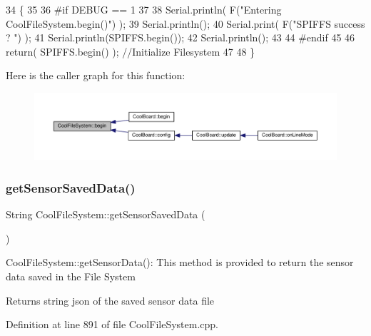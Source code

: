 \begin{DoxyCode}
34 \{
35 
36 \textcolor{preprocessor}{#if DEBUG == 1}
37 
38     Serial.println( F(\textcolor{stringliteral}{"Entering CoolFileSystem.begin()"}) );
39     Serial.println();   
40     Serial.print( F(\textcolor{stringliteral}{"SPIFFS success ? "}) );
41     Serial.println(SPIFFS.begin());
42     Serial.println();
43 
44 \textcolor{preprocessor}{#endif}
45 
46     \textcolor{keywordflow}{return}( SPIFFS.begin() );                                   \textcolor{comment}{//Initialize Filesystem}
47 
48 \}
\end{DoxyCode}
Here is the caller graph for this function\+:\nopagebreak
\begin{figure}[H]
\begin{center}
\leavevmode
\includegraphics[width=350pt]{classCoolFileSystem_a6ba6f666ed4c530174f8569d2c636748_icgraph}
\end{center}
\end{figure}
\mbox{\label{classCoolFileSystem_a5c58bca3735c0ed3efb268d70ef998ef}} 
\subsubsection{\texorpdfstring{get\+Sensor\+Saved\+Data()}{getSensorSavedData()}}
{\footnotesize\ttfamily String Cool\+File\+System\+::get\+Sensor\+Saved\+Data (\begin{DoxyParamCaption}{ }\end{DoxyParamCaption})}

Cool\+File\+System\+::get\+Sensor\+Data()\+: This method is provided to return the sensor data saved in the File System

\begin{DoxyReturn}{Returns}
string json of the saved sensor data file 
\end{DoxyReturn}


Definition at line 891 of file Cool\+File\+System.\+cpp.



